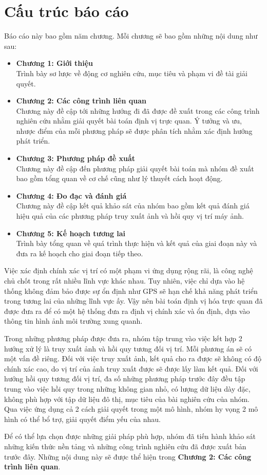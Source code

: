 \section{Cấu trúc báo cáo}
Báo cáo này bao gồm năm chương. Mỗi chương sẽ bao gồm những nội dung như sau:
\begin{itemize}
    \item \textbf{Chương 1: Giới thiệu} \\
    Trình bày sơ lược về động cơ nghiên cứu, mục tiêu và phạm vi đề tài giải quyết.
    \item \textbf{Chương 2: Các công trình liên quan} \\
    Chương này đề cập tới những hướng đi đã được đề xuất trong các công trình nghiên cứu nhằm giải quyết bài toán định vị trực quan. Ý tưởng và ưu, nhược điểm của mỗi phương pháp sẽ được phân tích nhằm xác định hướng phát triển.
    \item \textbf{Chương 3: Phương pháp đề xuất} \\
    Chương này đề cập đến phương pháp giải quyết bài toán mà nhóm đề xuất bao gồm tổng quan về cơ chế cũng như lý thuyết cách hoạt động.
    \item \textbf{Chương 4: Đo đạc và đánh giá} \\
    Chương này đề cập kết quả khảo sát của nhóm bao gồm kết quả đánh giá hiệu quả của các phương pháp truy xuất ảnh và hồi quy vị trí máy ảnh.
    \item \textbf{Chương 5: Kế hoạch tương lai} \\
    Trình bày tổng quan về quá trình thực hiện và kết quả của giai đoạn này và đưa ra kế hoạch cho giai đoạn tiếp theo.
\end{itemize}
\newpage
Việc xác định chính xác vị trí có một phạm vi ứng dụng rộng rãi, là công nghệ chủ chốt trong rất nhiều lĩnh vực khác nhau. Tuy nhiên, việc chỉ dựa vào hệ thống không đảm bảo được sự ổn định như GPS sẽ hạn chế khả năng phát triển trong tương lai của những lĩnh vực ấy. Vậy nên bài toán định vị hóa trực quan đã được đưa ra để có một hệ thống đưa ra định vị chính xác và ổn định, dựa vào thông tin hình ảnh môi trường xung quanh.

Trong những phương pháp được đưa ra, nhóm tập trung vào việc kết hợp 2 hướng xử lý là truy xuất ảnh và hồi quy tương đối vị trí. Mỗi phương án sẽ có một vấn đề riêng. Đối với việc truy xuất ảnh, kết quả cho ra được sẽ không có độ chính xác cao, do vị trí của ảnh truy xuất được sẽ được lấy làm kết quả. Đối với hướng hồi quy tương đối vị trí, đa số những phương pháp trước đây đều tập trung vào việc hồi quy trong những không gian nhỏ, có lượng dữ liệu dày đặc, không phù hợp với tập dữ liệu đô thị, mục tiêu của bài nghiên cứu của nhóm. Qua việc ứng dụng cả 2 cách giải quyết trong một mô hình, nhóm hy vọng 2 mô hình có thể bổ trợ, giải quyết điểm yếu của nhau.

Để có thể lựa chọn được những giải pháp phù hợp, nhóm đã tiến hành khảo sát những kiến thức nền tảng và những công trình nghiên cứu đã được xuất bản trước đây. Những nội dung này sẽ được thể hiện trong \textbf{Chương 2: Các công trình liên quan}.
